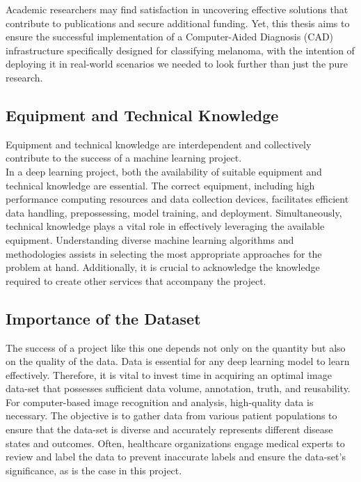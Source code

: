 Academic researchers may find satisfaction in uncovering effective solutions
that contribute to publications and secure additional funding. Yet, this thesis
aims to ensure the successful implementation of a Computer-Aided Diagnosis
(CAD) infrastructure specifically designed for classifying melanoma, with the
intention of deploying it in real-world scenarios we needed to look further
than just the pure research. \\

\subsection{Equipment and Technical Knowledge}

Equipment and technical knowledge are interdependent and collectively
contribute to the success of a machine learning project. \\

In a deep learning project, both the availability of suitable equipment and
technical knowledge are essential. The correct equipment, including high
performance computing resources and data collection devices, facilitates
efficient data handling, prepossessing, model training, and deployment.
Simultaneously, technical knowledge plays a vital role in effectively
leveraging the available equipment. Understanding diverse machine learning
algorithms and methodologies assists in selecting the most appropriate
approaches for the problem at hand. Additionally, it is crucial to acknowledge
the knowledge required to create other services that accompany the project. \\

\subsection{Importance of the Dataset}

The success of a project like this one depends not only on the quantity but
also on the quality of the data. Data is essential for any deep learning model
to learn effectively. Therefore, it is vital to invest time in acquiring an
optimal image data-set that possesses sufficient data volume, annotation,
truth, and reusability. \\

For computer-based image recognition and analysis, high-quality data is
necessary. The objective is to gather data from various patient populations to
ensure that the data-set is diverse and accurately represents different disease
states and outcomes. Often, healthcare organizations engage medical experts to
review and label the data to prevent inaccurate labels and ensure the
data-set's significance, as is the case in this project.

